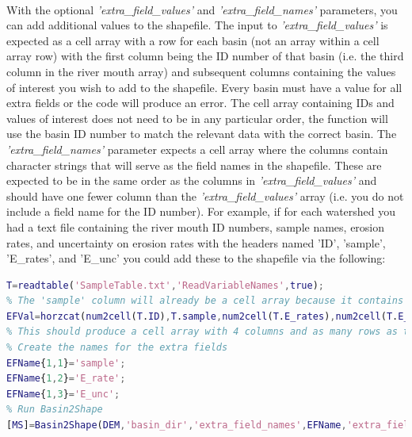 \paragraph{}With the optional \textit{'extra\_field\_values'} and \textit{'extra\_field\_names'} parameters, you can add additional values to the shapefile. The input to \textit{'extra\_field\_values'} is expected as a cell array with a row for each basin (not an array within a cell array row) with the first column being the ID number of that basin (i.e. the third column in the river mouth array) and subsequent columns containing the values of interest you wish to add to the shapefile. Every basin must have a value for all extra fields or the code will produce an error. The cell array containing IDs and values of interest does not need to be in any particular order, the function will use the basin ID number to match the relevant data with the correct basin. The \textit{'extra\_field\_names'} parameter expects a cell array where the columns contain character strings that will serve as the field names in the shapefile. These are expected to be in the same order as the columns in \textit{'extra\_field\_values'} and should have one fewer column than the \textit{'extra\_field\_values'}  array (i.e. you do not include a field name for the ID number). For example, if for each watershed you had a text file containing the river mouth ID numbers, sample names, erosion rates, and uncertainty on erosion rates with the headers named 'ID', 'sample', 'E\_rates', and 'E\_unc' you could add these to the shapefile via the following:

\begin{lstlisting}[language=Matlab]
% Load in your text file into a table specifying that it has a header containing the variable names, this is the easiest way to import mixed data containing both characters and numbers
T=readtable('SampleTable.txt','ReadVariableNames',true);
% The 'sample' column will already be a cell array because it contains characters, but the other columns will be numeric arrays so you will need to convert them to cell arrays and then horizontally concatenate them together
EFVal=horzcat(num2cell(T.ID),T.sample,num2cell(T.E_rates),num2cell(T.E_unc));
% This should produce a cell array with 4 columns and as many rows as there are basins
% Create the names for the extra fields
EFName{1,1}='sample';
EFName{1,2}='E_rate';
EFName{1,3}='E_unc';
% Run Basin2Shape
[MS]=Basin2Shape(DEM,'basin_dir','extra_field_names',EFName,'extra_field_values',EFVal);
\end{lstlisting} 

